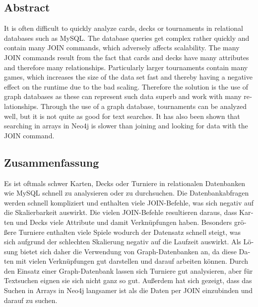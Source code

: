 \begingroup
\let\clearpage\relax
\let\cleardoublepage\relax
\let\cleardoublepage\relax

\begin{otherlanguage}{american}
\chapter*{Abstract}
It is often difficult to quickly analyze cards, decks or tournaments in relational databases such as MySQL. The database queries get complex rather quickly and contain many JOIN commands, which adversely affects scalability. The many JOIN commands result from the fact that cards and decks have many attributes and therefore many relationships. Particularly larger tournaments contain many games, which increases the size of the data set fast and thereby having a negative effect on the runtime due to the bad scaling. Therefore the solution is the use of graph databases as these can represent such data superb and work with many relationships. Through the use of a graph database, tournaments can be analyzed well, but it is not quite as good for text searches. It has also been shown that searching in arrays in Neo4j is slower than joining and looking for data with the JOIN command.

\end{otherlanguage}

\vfill

\begin{otherlanguage}{ngerman}
\chapter*{Zusammenfassung}

Es ist oftmals schwer Karten, Decks oder Turniere in relationalen Datenbanken wie MySQL schnell zu analysieren oder zu durchsuchen. Die Datenbankabfragen werden schnell kompliziert und enthalten viele JOIN-Befehle, was sich negativ auf die Skalierbarkeit auswirkt. Die vielen JOIN-Befehle resultieren daraus, dass Karten und Decks viele Attribute und damit Verknüpfungen haben. Besonders größere Turniere enthalten viele Spiele wodurch der Datensatz schnell steigt, was sich aufgrund der schlechten Skalierung negativ auf die Laufzeit auswirkt. Als Lösung bietet sich daher die Verwendung von Graph-Datenbanken an, da diese Daten mit vielen Verknüpfungen gut darstellen und darauf arbeiten können. Durch den Einsatz einer Graph-Datenbank lassen sich Turniere gut analysieren, aber für Textsuchen eignen sie sich nicht ganz so gut. Außerdem hat sich gezeigt, dass das Suchen in Arrays in Neo4j langsamer ist als die Daten per JOIN einzubinden und darauf zu suchen. 
\end{otherlanguage}

\endgroup			

\vfill